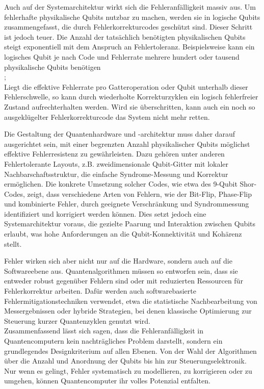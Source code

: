 Auch auf der Systemarchitektur wirkt sich die Fehleranfälligkeit massiv aus. Um fehlerhafte physikalische Qubits nutzbar zu machen, werden sie in logische Qubits zusammengefasst, die durch Fehlerkorrekturcodes geschützt sind. Dieser Schritt ist jedoch teuer. Die Anzahl der tatsächlich benötigten physikalischen Qubits steigt exponentiell mit dem Anspruch an Fehlertoleranz. Beispielsweise kann ein logisches Qubit je nach Code und Fehlerrate mehrere hundert oder tausend physikalische Qubits benötigen \cite[Seite 435–437]{nielsen_quantum_2010}\\; \cite[Seite 246-253]{rieffelQuantumComputingGentle2011a}\\

Liegt die effektive Fehlerrate pro Gatteroperation oder Qubit unterhalb dieser Fehlerschwelle, so kann durch wiederholte Korrekturzyklen ein logisch fehlerfreier Zustand aufrechterhalten werden. Wird sie überschritten, kann auch ein noch so ausgeklügelter Fehlerkorrekturcode das System nicht mehr retten.

Die Gestaltung der Quantenhardware und -architektur muss daher darauf ausgerichtet sein, mit einer begrenzten Anzahl physikalischer Qubits möglichst effektive Fehlerresistenz zu gewährleisten. Dazu gehören unter anderen Fehlertolerante Layouts, z.B. zweidimensionale Qubit-Gitter mit lokaler Nachbarschaftsstruktur, die einfache Syndrome-Messung und Korrektur ermöglichen.
Die konkrete Umsetzung solcher Codes, wie etwa des 9-Qubit Shor-Codes, zeigt, dass verschiedene Arten von Fehlern, wie der Bit-Flip, Phase-Flip und kombinierte Fehler, durch geeignete Verschränkung und Syndrommessung identifiziert und korrigiert werden können. Dies setzt jedoch eine Systemarchitektur voraus, die gezielte Paarung und Interaktion zwischen Qubits erlaubt, was hohe Anforderungen an die Qubit-Konnektivität und Kohärenz stellt.

Fehler wirken sich aber nicht nur auf die Hardware, sondern auch auf die Softwareebene aus. Quantenalgorithmen müssen so entworfen sein, dass sie entweder robust gegenüber Fehlern sind oder mit reduzierten Ressourcen für Fehlerkorrektur arbeiten. Dafür werden auch softwarebasierte Fehlermitigationstechniken verwendet, etwa die statistische Nachbearbeitung von Messergebnissen oder hybride Strategien, bei denen klassische Optimierung zur Steuerung kurzer Quantenzyklen genutzt wird. \cite[Seite 305-306]{rieffelQuantumComputingGentle2011a}\\

Zusammenfassend lässt sich sagen, dass die Fehleranfälligkeit in Quantencomputern kein nachträgliches Problem darstellt, sondern ein grundlegendes Designkriterium auf allen Ebenen. Von der Wahl der Algorithmen über die Anzahl und Anordnung der Qubits bis hin zur Steuerungselektronik. Nur wenn es gelingt, Fehler systematisch zu modellieren, zu korrigieren oder zu umgehen, können Quantencomputer ihr volles Potenzial entfalten.


